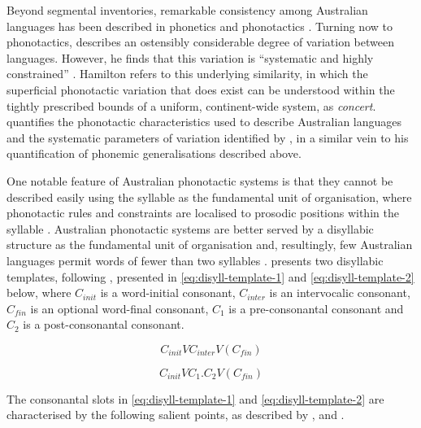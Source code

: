 Beyond segmental inventories, remarkable consistency among Australian languages has been described in phonetics \autocite{dixon_languages_1980} and phonotactics \autocites{dixon_languages_1980}{hamilton_phonetic_1996}{baker_word_2014}. Turning now to phonotactics, \textcite{hamilton_phonetic_1996} describes an ostensibly considerable degree of variation between languages. However, he finds that this variation is ``systematic and highly constrained'' \autocite[p.~29]{hamilton_phonetic_1996}. Hamilton refers to this underlying similarity, in which the superficial phonotactic variation that does exist can be understood within the tightly prescribed bounds of a uniform, continent-wide system, as \emph{concert}. \textcite{round_phonotactics_2021} quantifies the phonotactic characteristics used to describe Australian languages and the systematic parameters of variation identified by \textcite{hamilton_phonetic_1996}, in a similar vein to his quantification of phonemic generalisations described above.

One notable feature of Australian phonotactic systems is that they cannot be described easily using the syllable as the fundamental unit of organisation, where phonotactic rules and constraints are localised to prosodic positions within the syllable \autocites[e.g.][]{ito_syllable_1988}{goldsmith_autosegmental_1990}. Australian phonotactic systems are better served by a disyllabic structure as the fundamental unit of organisation and, resultingly, few Australian languages permit words of fewer than two syllables \autocite{dixon_languages_1980}. \textcite[p.~75]{hamilton_phonetic_1996} presents two disyllabic templates, following \textcite{dixon_languages_1980}, presented in \eqref{eq:disyll-template-1} and \eqref{eq:disyll-template-2} below, where \(C_{init}\) is a word-initial consonant, \(C_{inter}\) is an intervocalic consonant, \(C_{fin}\) is an optional word-final consonant, \(C_1\) is a pre-consonantal consonant and \(C_2\) is a post-consonantal consonant.

\begin{equation}
C_{init}VC_{inter}V(C_{fin})
\label{eq:disyll-template-1}
\end{equation}

\begin{equation}
C_{init}VC_1.C_2V(C_{fin})
\label{eq:disyll-template-2}
\end{equation}

The consonantal slots in \eqref{eq:disyll-template-1} and \eqref{eq:disyll-template-2} are characterised by the following salient points, as described by \textcite{dixon_languages_1980}, \textcite{hamilton_phonetic_1996} and \textcite{baker_word_2014}.

